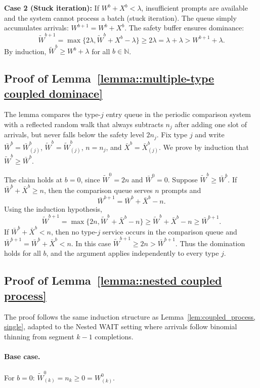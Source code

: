 \textbf{Case 2 (Stuck iteration):} If $W^b + X^b < \lambda$, insufficient prompts are available and the system cannot process a batch (stuck iteration). The queue simply accumulates arrivals: $W^{b+1} = W^b + X^b$. The safety buffer ensures dominance:
$$\tilde{W}^{b+1}=\max\{ 2\lambda, \tilde{W}^b + X^b - \lambda \}\geq 2\lambda = \lambda+\lambda>W^{b+1}+\lambda.$$
By induction, $\tilde{W}^b \geq W^b + \lambda$ for all $b \in \mathbb{N}$.

\subsection{Proof of Lemma~\ref{lemma::multiple-type coupled dominace}}\label{appendix_lemma::proof of multiple-type coupled dominace}
The lemma compares the type-\(j\) entry queue in the periodic comparison system with a reflected random walk that always subtracts \(n_j\) after adding one slot of arrivals, but never falls below the safety level \(2n_j\). Fix type \(j\) and write \(\bar W^b=\bar W^b_{(j)}\), \(\widetilde W^b=\widetilde W^b_{(j)}\), \(n=n_j\), and \(\bar X^b=\bar X^b_{(j)}\). We prove by induction that \(\widetilde W^b\ge \bar W^b\).

The claim holds at \(b=0\), since \(\widetilde W^0=2n\) and \(\bar W^0=0\). Suppose \(\widetilde W^b\ge \bar W^b\). If \(\bar W^b+\bar X^b\ge n\), then the comparison queue serves \(n\) prompts and
\[
    \bar W^{b+1}=\bar W^b+\bar X^b-n.
\]
Using the induction hypothesis,
\[
    \widetilde W^{b+1}
    =\max\{2n,\widetilde W^b+\bar X^b-n\}
    \ge \widetilde W^b+\bar X^b-n
    \ge \bar W^{b+1}.
\]
If \(\bar W^b+\bar X^b<n\), then no type-\(j\) service occurs in the comparison queue and \(\bar W^{b+1}=\bar W^b+\bar X^b<n\). In this case \(\widetilde W^{b+1}\ge2n>\bar W^{b+1}\). Thus the domination holds for all \(b\), and the argument applies independently to every type \(j\).

\subsection{Proof of Lemma~\ref{lemma::nested coupled process}}\label{appendix_lemma::proof of nested coupled process}
The proof follows the same induction structure as Lemma~\ref{lem:coupled_process, single}, adapted to the Nested WAIT setting where arrivals follow binomial thinning from segment $k-1$ completions.

\paragraph{Base case.} For $b = 0$: $\tilde{W}_{(k)}^0 = n_{k}\geq 0=W_{(k)}^0$.

